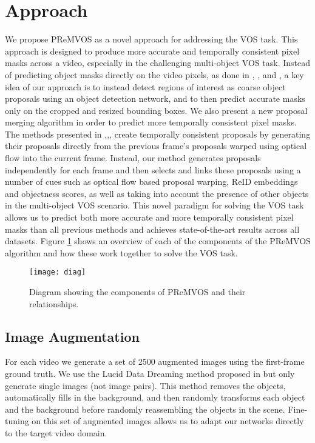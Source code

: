 \documentclass[runningheads]{llncs}
\begin{document}
\section{Approach}
We propose PReMVOS as a novel approach for addressing the VOS task. This approach is designed to produce more accurate and temporally consistent pixel masks across a video, especially in the challenging multi-object VOS task. Instead of predicting object masks directly on the video pixels, as done in \cite{caelles2017one}, \cite{maninis2017video}, \cite{voigtlaender17DAVIS} and \cite{voigtlaender17BMVC}, a key idea of our approach is to instead detect regions of interest as coarse object proposals using an object detection network, and to then predict accurate masks only on the cropped and resized bounding boxes.
We also present a new proposal merging algorithm in order to predict more temporally consistent pixel masks. The methods presented in \cite{Perazzi2017CVPR},\cite{li2017video},\cite{khoreva2017lucid},\cite{li2018video} create temporally consistent proposals by generating their proposals directly from the previous frame's proposals warped using optical flow into the current frame. Instead, our method generates proposals independently for each frame and then selects and links these proposals using a number of cues such as optical flow based proposal warping, ReID embeddings and objectness scores, as well as taking into account the presence of other objects in the multi-object VOS scenario.
This novel paradigm for solving the VOS task allows us to predict both more accurate and more temporally consistent pixel masks than all previous methods and achieves state-of-the-art results across all datasets. Figure \ref{fig:diag} shows an overview of each of the components of the PReMVOS algorithm and how these work together to solve the VOS task.

\begin{figure}[t!]
  \centering
    \texttt{[image: diag]}
  \caption{Diagram showing the components of PReMVOS and their relationships.}
  \label{fig:diag}
\end{figure}

\subsection{Image Augmentation}
For each video we generate a set of 2500 augmented images using the first-frame ground truth. We use the Lucid Data Dreaming method proposed in \cite{khoreva2017lucid} but only generate single images (not image pairs). This method removes the objects, automatically fills in the background, and then randomly transforms each object and the background before randomly reassembling the objects in the scene. Fine-tuning on this set of augmented images allows us to adapt our networks directly to the target video domain.
\end{document}
